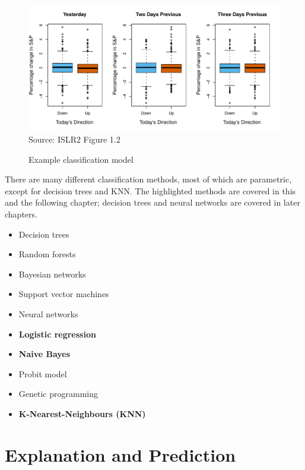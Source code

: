\begin{figure}
\centering
\includegraphics[width=.75\textwidth]{Figures_Chapters_1-6/Chapter1/1_2.pdf} \\
\scriptsize Source: ISLR2 Figure 1.2
\caption{Example classification model}
\label{fig:classification}
\end{figure}

There are many different classification methods, most of which are parametric, except for decision trees and KNN. The highlighted methods are covered in this and the following chapter; decision trees and neural networks are covered in later chapters.

\begin{itemize}
   \item Decision trees
   \item Random forests
   \item Bayesian networks
   \item Support vector machines
   \item Neural networks
   \item \textbf{Logistic regression}
   \item \textbf{Naive Bayes}
   \item Probit model
   \item Genetic programming
   \item \textbf{K-Nearest-Neighbours (KNN)}
\end{itemize}

\section{Explanation and Prediction}

